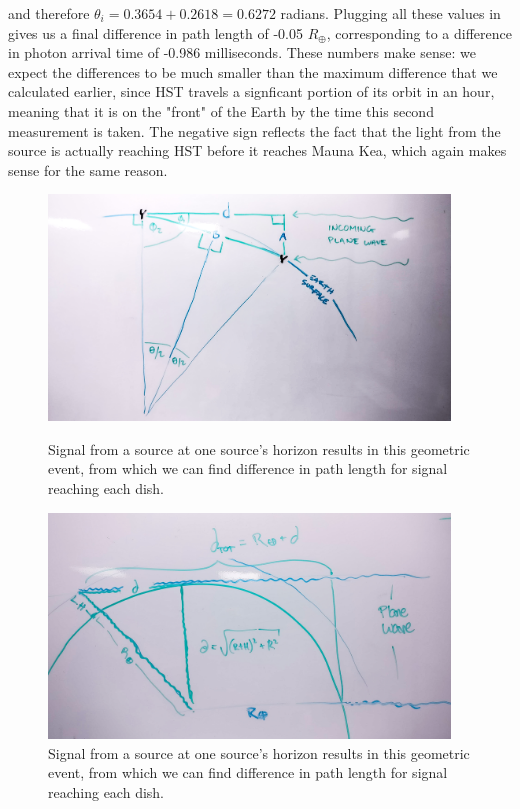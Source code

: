 \documentclass[12pt]{article}
\begin{document}
\begin{onehalfspacing}
and therefore $\theta_i = 0.3654 + 0.2618 = 0.6272$ radians. Plugging all these values in gives us a final difference in path length of -0.05 $R_{\oplus}$, corresponding to a difference in photon arrival time of -0.986 milliseconds. These numbers make sense: we expect the differences to be much smaller than the maximum difference that we calculated earlier, since HST travels a signficant portion of its orbit in an hour, meaning that it is on the "front" of the Earth by the time this second measurement is taken. The negative sign reflects the fact that the light from the source is actually reaching HST before it reaches Mauna Kea, which again makes sense for the same reason.










\newpage


\begin{figure}
    \centering
    \begin{minipage}{0.48\textwidth}
        \centering
        \includegraphics[width=0.95\textwidth]{prob1b} %
        \caption{Signal from a source at one source's horizon results in this geometric event, from which we can find difference in path length for signal reaching each dish.}
    \end{minipage}\hfill
    \begin{minipage}{0.48\textwidth}
        \centering
        \includegraphics[width=0.95\textwidth]{prob2b} %
        \caption{Signal from a source at one source's horizon results in this geometric event, from which we can find difference in path length for signal reaching each dish.}
    \end{minipage}
\end{figure}


\end{onehalfspacing}
\end{document}

